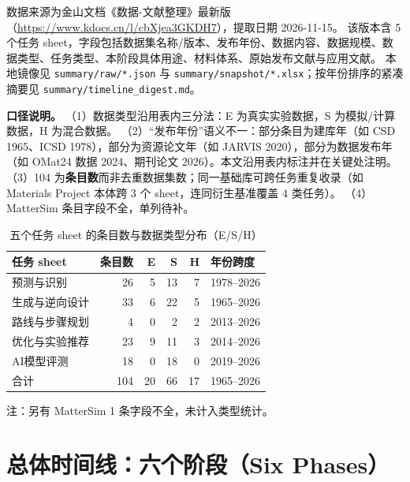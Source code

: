 \documentclass[11pt,a4paper]{ctexart}
\begin{document}
数据来源为金山文档《数据-文献整理》最新版（\url{https://www.kdocs.cn/l/cbXjea3GKDH7}），提取日期 2026-11-15。
该版本含 5 个任务 sheet，字段包括数据集名称/版本、发布年份、数据内容、数据规模、数据类型、任务类型、本阶段具体用途、材料体系、原始发布文献与应用文献。
本地镜像见 \texttt{summary/raw/*.json} 与 \texttt{summary/snapshot/*.xlsx}；按年份排序的紧凑摘要见 \texttt{summary/timeline\_digest.md}。

\textbf{口径说明。}
（1）数据类型沿用表内三分法：E 为真实实验数据，S 为模拟/计算数据，H 为混合数据。
（2）``发布年份''语义不一：部分条目为建库年（如 CSD 1965、ICSD 1978），部分为资源论文年（如 JARVIS 2020），部分为数据发布年（如 OMat24 数据 2024、期刊论文 2026）。本文沿用表内标注并在关键处注明。
（3）104 为\textbf{条目数}而非去重数据集数；同一基础库可跨任务重复收录（如 Materials Project 本体跨 3 个 sheet，连同衍生基准覆盖 4 类任务）。
（4）MatterSim 条目字段不全，单列待补。

\begin{table}[h]
\centering\small
\caption{五个任务 sheet 的条目数与数据类型分布（E/S/H）}
\begin{tabular}{@{}lrrrrl@{}}
\toprule
任务 sheet & 条目数 & E & S & H & 年份跨度 \\
\midrule
预测与识别 & 26 & 5 & 13 & 7 & 1978--2026 \\
生成与逆向设计 & 33 & 6 & 22 & 5 & 1965--2026 \\
路线与步骤规划 & 4 & 0 & 2 & 2 & 2013--2026 \\
优化与实验推荐 & 23 & 9 & 11 & 3 & 2014--2026 \\
AI模型评测 & 18 & 0 & 18 & 0 & 2019--2026 \\
\midrule
合计 & 104 & 20 & 66 & 17 & 1965--2026 \\
\bottomrule
\end{tabular}

\smallskip
注：另有 MatterSim 1 条字段不全，未计入类型统计。
\end{table}

\section{总体时间线：六个阶段（Six Phases）}
\end{document}
